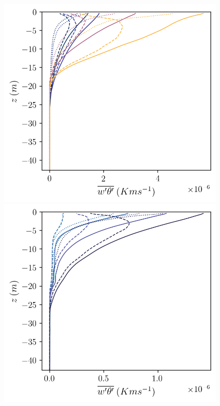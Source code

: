 \documentclass[draft,jgrga]{agutexSI2019}
\begin{document}
\begin{figure}[]
\begin{minipage}{0.5\textwidth}
    \end{minipage}
    \begin{minipage}{0.5\textwidth}
        \includegraphics[trim={0 0 0 0},clip, width=\textwidth]{Figures/heatflux_res_sgs_cmp_dT_43h_tav13h_z_profile.png}
    \end{minipage}%
    \begin{minipage}{0.5\textwidth}
        \includegraphics[trim={0 0 0 0},clip, width=\textwidth]{Figures/heatflux_res_sgs_cmp_dslope_43h_tav13h_z_profile.png}

\end{minipage}
\end{figure}
\end{document}
